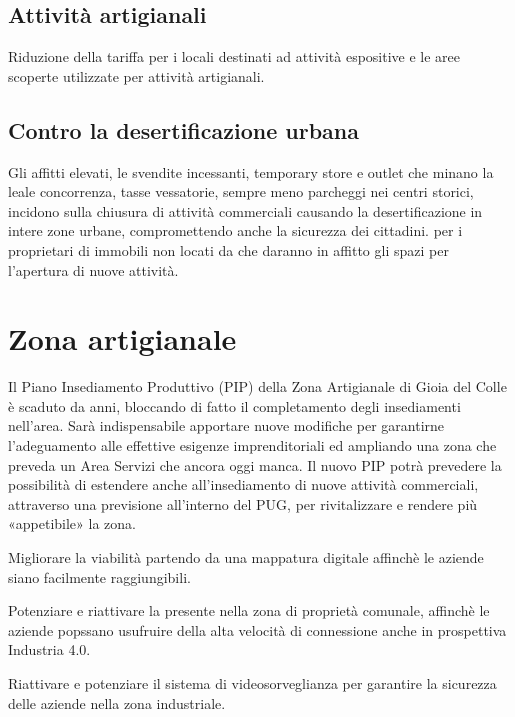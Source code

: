 \documentclass[a4paper,14pt,italian]{sphinxmanual}
\begin{document}
\subsection{Attività artigianali}
\label{\detokenize{commercio:attivita-artigianali}}
Riduzione della tariffa per i locali destinati ad attività espositive e le aree scoperte utilizzate per attività artigianali.


\subsection{Contro la desertificazione urbana}
\label{\detokenize{commercio:contro-la-desertificazione-urbana}}
Gli affitti elevati, le svendite incessanti, temporary store e outlet che minano la leale concorrenza, tasse vessatorie, sempre meno parcheggi nei centri storici, incidono sulla chiusura di attività commerciali causando la desertificazione in intere zone urbane, compromettendo anche la sicurezza dei cittadini.
 per i proprietari di immobili non locati da  che daranno in affitto gli spazi per l’apertura di nuove attività.


\section{Zona artigianale}
\label{\detokenize{commercio:zona-artigianale}}
Il Piano Insediamento Produttivo (PIP) della Zona Artigianale di Gioia del Colle è scaduto da anni, bloccando di fatto il completamento degli insediamenti nell’area.
Sarà indispensabile apportare nuove modifiche per garantirne l’adeguamento alle effettive esigenze imprenditoriali ed ampliando una zona che preveda un Area Servizi che ancora oggi manca.
Il nuovo PIP potrà prevedere la possibilità di estendere anche all’insediamento di nuove attività commerciali, attraverso una previsione all’interno del PUG, per rivitalizzare e rendere più «appetibile» la zona.

Migliorare la viabilità partendo da una mappatura digitale affinchè le aziende siano facilmente raggiungibili.

Potenziare e riattivare la  presente nella zona di proprietà comunale, affinchè le aziende popssano usufruire della alta velocità di connessione anche in prospettiva Industria 4.0.

Riattivare e potenziare il sistema di videosorveglianza per garantire la sicurezza delle aziende nella zona industriale.
\end{document}
